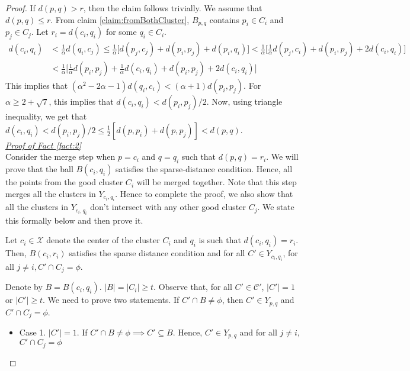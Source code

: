 \documentclass[11pt]{article}
\newcommand{\mc}{\mathcal}
\begin{document}
\begin{proof}
\vspace{-0.1in} If $d(p, q) > r$, then the claim follows trivially. We assume that $d(p, q) \le r$. From claim \ref{claim:fromBothCluster}, $B_{p, q}$ contains $p_i \in C_i$ and $p_j \in C_j$. Let $r_i = d(c_i, q_i)$ for some $q_i \in C_i$.
\begin{align*}
d(c_i, q_i) &< \frac{1}{\alpha} d(q_i, c_j) \le \frac{1}{\alpha} \bigg[ d(p_j, c_j) + d(p_i, p_j) + d(p_i, q_i)\bigg] < \frac{1}{\alpha} \bigg[ \frac{1}{\alpha}d(p_j, c_i) + d(p_i, p_j) + 2d(c_i, q_i)\bigg]\\
& < \frac{1}{\alpha} \bigg[ \frac{1}{\alpha}d(p_i, p_j) + \frac{1}{\alpha}d(c_i, q_i) + d(p_i, p_j) + 2d(c_i, q_i)\bigg]
\end{align*}
This implies that $(\alpha^2 - 2\alpha - 1)d(q_i, c_i) < (\alpha + 1) d(p_i, p_j)$. For $\alpha \ge 2 + \sqrt 7$, this implies that $d(c_i, q_i) < d(p_i, p_j)/2$. Now, using triangle inequality, we get that $d(c_i, q_i) < d(p_i, p_j)/2 \le \frac{1}{2}[d(p, p_i) + d(p, p_j)] < d(p, q)$.\\

\noindent\textit{\underline{Proof of Fact \ref{fact:2}%
}}\\
Consider the merge step when $p = c_i$ and $q = q_i$ such that $d(p, q) = r_i$. We will prove that the ball $B(c_i, q_i)$ satisfies the sparse-distance condition. Hence, all the points from the good cluster $C_i$ will be merged together. Note that this step merges all the clusters in $Y_{c_i, q_i}$. Hence to complete the proof, we also show that all the clusters in $Y_{c_i, q_i}$ don't intersect with any other good cluster $C_j$. We state this formally below and then prove it.

\begin{claim}
\label{claim:dciqi}
Let $c_i \in \mc X$ denote the center of the cluster $C_i$ and $q_i$ is such that $d(c_i, q_i) = r_i$. Then, $B(c_i, r_i)$ satisfies the sparse distance condition and for all $C' \in Y_{c_i, q_i}$, for all $j \neq i, C' \cap C_j = \phi$.
\end{claim}

\vspace{-0.1in} Denote by $B = B(c_i, q_i)$. $|B| = |C_i| \ge t$. Observe that, for all $C' \in \mc C'$, $|C'| = 1$ or $|C'| \ge t$. We need to prove two statements. If $C' \cap B \neq \phi$, then $C' \in Y_{p,q}$ and $C' \cap C_j = \phi$. 

\begin{itemize}[nolistsep]
\item Case 1. $|C'| = 1$. If $C' \cap B \neq \phi \implies C' \subseteq B$. Hence, $C' \in Y_{p,q}$ and for all $j \neq i$, $C' \cap C_j = \phi$


\end{itemize}
\end{proof}
\end{document}
